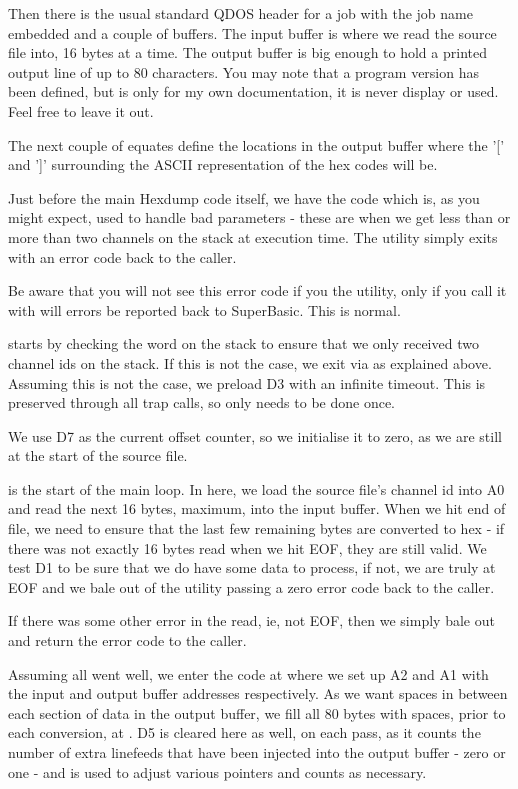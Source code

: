 Then there is the usual standard QDOS header for a job with the job name embedded and a couple of buffers. The input buffer is where we read the source file into, 16 bytes at a time. The output buffer is big enough to hold a printed output line of up to 80 characters. You may note that a program version has been defined, but is only for my own documentation, it is never display or used. Feel free to leave it out.

The next couple of equates define the locations in the output buffer where the '[' and ']' surrounding the ASCII representation of the hex codes will be.

Just before the main Hexdump code itself, we have the  code which is, as you might expect, used to handle bad parameters - these are when we get less than or more than two channels on the stack at execution time. The utility simply exits with an error code back to the caller. 

Be aware that you will not see this error code if you  the utility, only if you call it with  will errors be reported back to SuperBasic. This is normal.

 starts by checking the word on the stack to ensure that we only received two channel ids on the stack. If this is not the case, we exit via  as explained above. Assuming this is not the case, we preload D3 with an infinite timeout. This is preserved through all trap calls, so only needs to be done once.

We use D7 as the current offset counter, so we initialise it to zero, as we are still at the start of the source file.

 is the start of the main loop. In here, we load the source file's channel id into A0 and read the next 16 bytes, maximum, into the input buffer. When we hit end of file, we need to ensure that the last few remaining bytes are converted to hex - if there was not exactly 16 bytes read when we hit EOF, they are still valid. We test D1 to be sure that we do have some data to process, if not, we are truly at EOF and we bale out of the utility passing a zero error code back to the caller.

If there was some other error in the read, ie, not EOF, then we simply bale out and return the error code to the caller. 

Assuming all went well, we enter the code at  where we set up A2 and A1 with the input and output buffer addresses respectively. As we want spaces in between each section of data in the output buffer, we fill all 80 bytes with spaces, prior to each conversion, at . D5 is cleared here as well, on each pass, as it counts the number of extra linefeeds that have been injected into the output buffer - zero or one - and is used to adjust various pointers and counts as necessary.


